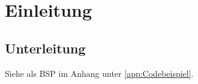 \section{Einleitung}
\label{sec:Einleitung}
\lipsum[1]

    \subsection{Unterleitung}
    \label{sec:Unterleitung}
    \lipsum[3]
    Siehe als \ac{BSP} im Anhang unter \ref{app:Codebeispiel}.
    \lipsum[1]
    \cite{BSPLIT}